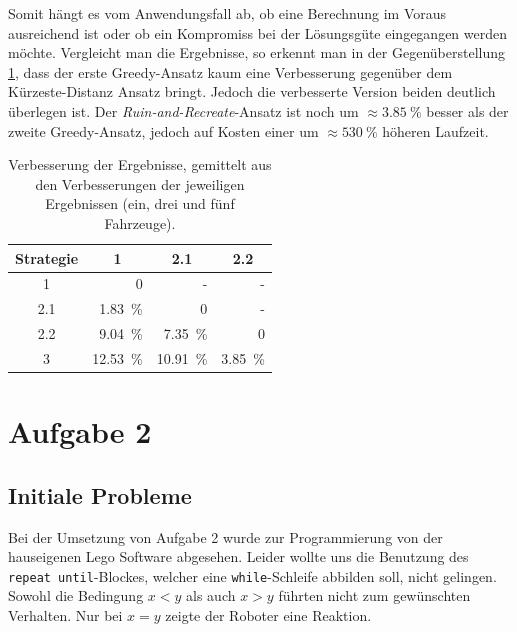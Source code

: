 \documentclass[ngerman]{tudscrreprt}
\newcommand{\code}[1]{\texttt{#1}}
\begin{document}
Somit hängt es vom Anwendungsfall ab, ob eine Berechnung im Voraus ausreichend ist oder
ob ein Kompromiss bei der Lösungsgüte eingegangen werden möchte.
Vergleicht man die Ergebnisse, so erkennt man in der Gegenüberstellung
\ref{table:compare-strategies}, dass der erste Greedy-Ansatz kaum eine Verbesserung
gegenüber dem Kürzeste-Distanz Ansatz bringt.
Jedoch die verbesserte Version beiden deutlich überlegen ist.
Der \emph{Ruin-and-Recreate}-Ansatz ist noch um $\approx \SI{3.85}{\percent}$ besser als
der zweite Greedy-Ansatz, jedoch auf Kosten einer um $\approx \SI{530}{\percent}$ höheren
Laufzeit.

\begin{table}[H]
    \centering
    \begin{tabular}{|c|r|r|r|}
    \hline\centering
    Strategie & \multicolumn{1}{c|}{1} & \multicolumn{1}{c|}{2.1} & \multicolumn{1}{c|}{2.2}
                                                                                        \\ \hline
    1         & 0                      & -                        & -                   \\ \hline
    2.1       & \SI{ 1.83}{\percent}   & 0                        & -                   \\ \hline
    2.2       & \SI{ 9.04}{\percent}   & \SI{ 7.35}{\percent}     & 0                   \\ \hline
    3         & \SI{12.53}{\percent}   & \SI{10.91}{\percent}     & \SI{3.85}{\percent} \\ \hline
    \end{tabular}
    \caption{Verbesserung der Ergebnisse, gemittelt aus den Verbesserungen der jeweiligen
    Ergebnissen (ein, drei und fünf Fahrzeuge).}
    \label{table:compare-strategies}
\end{table}

\chapter{Aufgabe 2}
\section{Initiale Probleme}
Bei der Umsetzung von Aufgabe 2 wurde zur Programmierung von der hauseigenen Lego Software
abgesehen. Leider wollte uns die Benutzung des \code{repeat until}-Blockes, welcher eine
\code{while}-Schleife abbilden soll, nicht gelingen. Sowohl die Bedingung $x < y$ als auch
$x > y$ führten nicht zum gewünschten Verhalten. Nur bei $x = y$ zeigte der Roboter eine
Reaktion.
\end{document}
